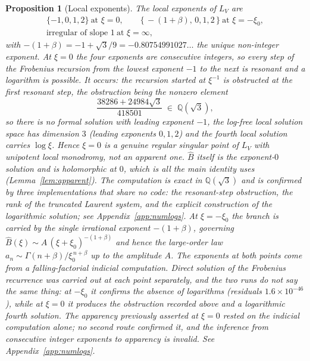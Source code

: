 \documentclass[11pt,reqno]{amsart}
\renewcommand{\_}{\vquadorigunderscore\allowbreak}
\theoremstyle{plain}
\newtheorem{proposition}[theorem]{Proposition}
\theoremstyle{definition}
\newcommand{\Bhat}{\widehat{B}}
\newcommand{\LV}{L_{V}}
\newcommand{\Qsqrt}{\mathbb{Q}(\sqrt3)}
\newcommand{\xizero}{\xi_0}
\begin{document}
\begin{proposition}[Local exponents]\label{prop:exponents}
The local exponents of $\LV$ are
\[
\begin{gathered}
  \{-1,0,1,2\}\ \text{at } \xi=0,\qquad
  \{\,-(1+\beta),\,0,1,2\,\}\ \text{at } \xi=-\xizero,\\
  \text{irregular of slope }1\ \text{at } \xi=\infty,
\end{gathered}
\]
with $-(1+\beta)=-1+\sqrt3/9=-0.80754991027\ldots$ the unique non-integer exponent. At $\xi=0$
the four exponents are consecutive integers, so every step of the Frobenius recursion from the
lowest exponent $-1$ to the next is \emph{resonant} and a logarithm is possible. It occurs: the
recursion started at $\xi^{-1}$ is obstructed at the first resonant step, the obstruction being
the nonzero element
\[
  \frac{38286+24984\sqrt3}{418501}\;\in\;\Qsqrt ,
\]
so there is no formal solution with leading exponent $-1$, the log-free local solution space has
dimension $3$ (leading exponents $0,1,2$) and the fourth local solution carries $\log\xi$. Hence
$\xi=0$ is a genuine regular singular point of $\LV$ with unipotent local monodromy, \emph{not}
an apparent one. $\Bhat$ itself is the exponent-$0$ solution and is holomorphic at $0$, which is
all the main identity uses (Lemma~\ref{lem:apparent}). The computation is exact in $\Qsqrt$ and
is confirmed by three implementations that share no code: the resonant-step obstruction, the
rank of the truncated Laurent system, and the explicit construction of the logarithmic solution;
see Appendix~\ref{app:numlogs}. At $\xi=-\xizero$ the branch is carried by the
single irrational exponent $-(1+\beta)$, governing $\Bhat(\xi)\sim A\,(\xi+\xizero)^{-(1+\beta)}$
and hence the large-order law $a_n\sim \Gamma(n+\beta)/\xizero^{\,n+\beta}$ up to the amplitude
$A$. The exponents at both points come from a falling-factorial indicial
computation. Direct solution of the Frobenius recurrence was carried out at each
point separately, and the two runs do not say the same thing: at $-\xizero$ it
confirms the absence of logarithms (residuals $1.6\times10^{-46}$), while at $\xi=0$ it
produces the obstruction recorded above and a logarithmic fourth solution. The
apparency previously asserted at $\xi=0$ rested on the indicial computation alone;
no second route confirmed it, and the inference from consecutive integer exponents
to apparency is invalid. See Appendix~\ref{app:numlogs}.
\end{proposition}
\end{document}
